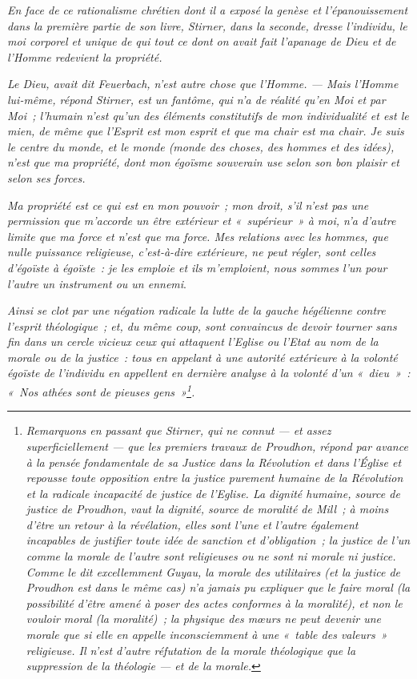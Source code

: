 \documentclass[french,twoside]{book} %
\begin{document}
\emph{En face de ce rationalisme chrétien dont il a exposé la genèse et l’épanouissement dans la première partie de son livre, Stirner, dans la seconde, dresse l’individu, le moi corporel et unique de qui tout ce dont on avait fait l’apanage de Dieu et de l’Homme redevient la \emph{propriété}.}\par
\emph{Le Dieu, avait dit Feuerbach, n’est autre chose que l’Homme. — Mais l’Homme lui-même, répond Stirner, est un fantôme, qui n’a de réalité qu’en Moi et par Moi ; l’humain n’est qu’un des éléments constitutifs de mon individualité et est le mien, de même que l’Esprit est mon esprit et que ma chair est ma chair. Je suis le centre du monde, et le monde (monde des choses, des hommes et des idées), n’est que ma propriété, dont mon égoïsme souverain use selon son bon plaisir et selon ses forces.}\par
\emph{Ma propriété est ce qui est en mon pouvoir ; mon droit, s’il n’est pas une permission que m’accorde un être extérieur  et « supérieur » à moi, n’a d’autre limite que ma force et n’est que ma force. Mes relations avec les hommes, que nulle puissance religieuse, c’est-à-dire extérieure, ne peut régler, sont celles d’égoïste à égoïste : je les emploie et ils m’emploient, nous sommes l’un pour l’autre un instrument ou un ennemi}.\par
\emph{Ainsi se clot par une négation radicale la lutte de la gauche hégélienne contre l’esprit théologique ; et, du même coup, sont convaincus de devoir tourner sans fin dans un cercle vicieux ceux qui attaquent l’Eglise ou l’Etat au nom de la morale ou de la justice : tous en appelant à une autorité extérieure à la volonté égoïste de l’individu en appellent en dernière analyse à la volonté d’un « dieu » : « Nos athées sont de pieuses gens »\footnote{ \noindent \emph{Remarquons en passant que Stirner, qui ne connut — et assez superficiellement — que les premiers travaux de Proudhon, répond par avance à la pensée fondamentale de sa \emph{Justice dans la Révolution et dans l'Église} et repousse toute opposition entre la justice purement humaine de la Révolution et la radicale incapacité de justice de l'Eglise. La dignité humaine, source de justice de Proudhon, vaut la dignité, source de moralité de Mill ; à moins d'être un retour à la révélation, elles sont l'une et l'autre également incapables de justifier toute idée de sanction et d'obligation ; la justice de l'un comme la morale de l'autre sont religieuses ou ne sont ni morale ni justice. Comme le dit excellemment Guyau, la morale des utilitaires (et la justice de Proudhon est dans le même cas) n'a jamais pu expliquer que le \emph{faire} moral (la possibilité d'être amené à poser des actes conformes à la moralité), et non le \emph{vouloir} moral (la moralité) ; la physique des mœurs ne peut devenir une morale que si elle en appelle inconsciemment à une « table des valeurs » religieuse. Il n'est d'autre réfutation de la morale théologique que la suppression de la théologie — et de la morale.}
 }.}\par
\end{document}
